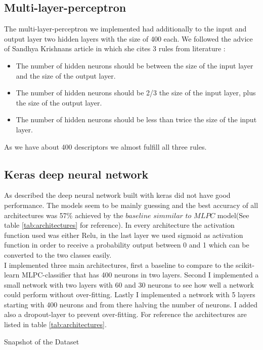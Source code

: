 \documentclass[12pt]{article}
\begin{document}
\subsection{Multi-layer-perceptron}
\label{sec:architectures:Multi-layer-perceptron}
The multi-layer-perceptron we implemented had additionally to the input and output layer two hidden layers with the size of 400 each. We followed the advice of Sandhya Krishnans \cite{NumNeurons} article in which she cites 3 rules from literature \cite{Neunets2}:
\begin{itemize}
\item The number of hidden neurons should be between the size of the input layer and the size of the output layer.
\item The number of hidden neurons should be 2/3 the size of the input layer, plus the size of the output layer.
\item The number of hidden neurons should be less than twice the size of the input layer.
\end{itemize}

As we have about 400 descriptors we almost fulfill all three rules.
\subsection{Keras deep neural network}
\label{sec:architectures:Keras-deep-model}
As described the deep neural network built with keras did not have good performance. The models seem to be mainly guessing and the best accuracy of all architectures was 57\% achieved by the $\textit{baseline simmilar to MLPC}$ model(See table \ref{tab:architectures} for reference).
In every architecture the activation function used was either Relu, in the last layer we used sigmoid as activation function in order to receive a probability output between 0 and 1 which can be converted to the two classes easily.\\
I implemented three main architectures, first a baseline to compare to the scikit-learn MLPC-classifier that has 400 neurons in two layers. Second I implemented a small network with two layers with 60 and 30 neurons to see how well a network could perform without over-fitting. Lastly I implemented a network with 5 layers starting with 400 neurons and from there halving the number of neurons. I added also a dropout-layer to prevent over-fitting. For reference the architectures are listed in table \ref{tab:architectures}.
 
\begin{table}[t]
\centering

\caption{Snapshot of the Dataset}
\label{tab:architectures}
\end{table}
\end{document}
